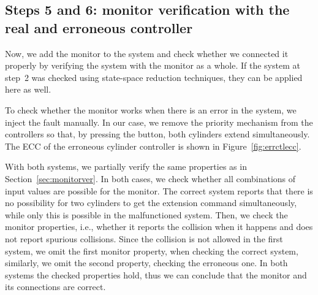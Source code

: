 \documentclass[conference]{IEEEtran}
\begin{document}



\subsection{Steps 5 and 6: monitor verification with the real and erroneous controller}

Now, we add the monitor to the system and check whether we connected it properly by verifying the system with the monitor as a whole. If the system at step~2 was checked using state-space reduction techniques, they can be applied here as well.

To check whether the monitor works when there is an error in the system, we inject the fault manually. In our case, we remove the priority mechanism from the controllers so that, by pressing the button, both cylinders extend simultaneously. The ECC of the erroneous cylinder controller is shown in Figure~\ref{fig:errctlecc}.

With both systems, we partially verify the same properties as in Section~\ref{sec:monitorver}. In both cases, we check whether all combinations of input values are possible for the monitor. The correct system reports that there is no possibility for two cylinders to get the extension command simultaneously, while only this is possible in the malfunctioned system. Then, we check the monitor properties, i.e., whether it reports the collision when it happens and does not report spurious collisions. Since the collision is not allowed in the first system, we omit the first monitor property, when checking the correct system, similarly, we omit the second property, checking the erroneous one. In both systems the checked properties hold, thus we can conclude that the monitor and its connections are correct.
\end{document}
